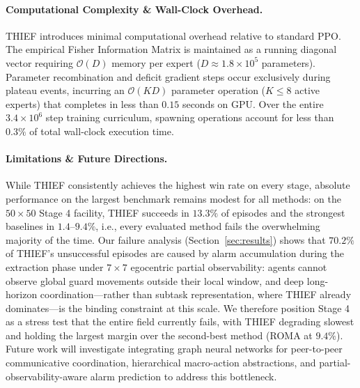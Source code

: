 \paragraph{Computational Complexity \& Wall-Clock Overhead.}
THIEF introduces minimal computational overhead relative to standard PPO. The empirical Fisher Information Matrix is maintained as a running diagonal vector requiring $\mathcal{O}(D)$ memory per expert ($D \approx 1.8 \times 10^5$ parameters). Parameter recombination and deficit gradient steps occur exclusively during plateau events, incurring an $\mathcal{O}(KD)$ parameter operation ($K \le 8$ active experts) that completes in less than $0.15$ seconds on GPU. Over the entire $3.4 \times 10^6$ step training curriculum, spawning operations account for less than $0.3\%$ of total wall-clock execution time.

\paragraph{Limitations \& Future Directions.}
While THIEF consistently achieves the highest win rate on every stage, absolute performance on the largest benchmark remains modest for all methods: on the $50 \times 50$ Stage 4 facility, THIEF succeeds in $13.3\%$ of episodes and the strongest baselines in $1.4$--$9.4\%$, i.e., every evaluated method fails the overwhelming majority of the time. Our failure analysis (Section~\ref{sec:results}) shows that $70.2\%$ of THIEF's unsuccessful episodes are caused by alarm accumulation during the extraction phase under $7 \times 7$ egocentric partial observability: agents cannot observe global guard movements outside their local window, and deep long-horizon coordination---rather than subtask representation, where THIEF already dominates---is the binding constraint at this scale. We therefore position Stage 4 as a stress test that the entire field currently fails, with THIEF degrading slowest and holding the largest margin over the second-best method (ROMA at $9.4\%$). Future work will investigate integrating graph neural networks for peer-to-peer communicative coordination, hierarchical macro-action abstractions, and partial-observability-aware alarm prediction to address this bottleneck.

